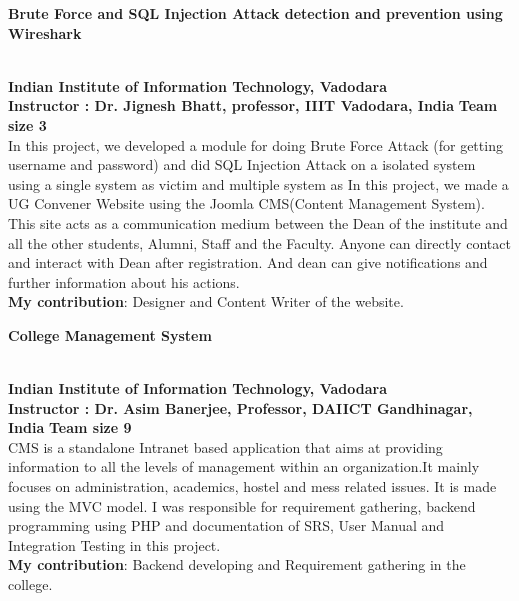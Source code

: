\documentclass{article}
\begin{document}
\begin{large}\textbf{Brute Force and SQL Injection Attack detection and prevention using Wireshark }\end{large} \\
\textbf{Indian Institute of Information Technology, Vadodara}\\
\textbf{ Instructor : Dr. Jignesh Bhatt, professor, IIIT Vadodara, India } \hfill{}
\textbf{Team size 3} \\
In this project, we developed a module for doing Brute Force Attack (for getting username and password) and did SQL Injection Attack on a isolated system using a single system as victim and multiple system as 	In this project, we made a UG Convener Website using the Joomla
CMS(Content Management System). This site acts as a communication medium between the Dean of the institute and all the other students, Alumni, Staff and the Faculty. Anyone can directly contact and interact with Dean after registration. And dean can give notifications and further information about his actions. \\
\textbf{My contribution}: Designer and Content Writer of the website.\\



\begin{large}\textbf{College Management System }\end{large} \\
\textbf{Indian Institute of Information Technology, Vadodara}\\
\textbf{Instructor : Dr. Asim Banerjee, Professor, DAIICT Gandhinagar, India}\hfill{}
\textbf{Team size 9} \\
CMS is a standalone Intranet based application that aims at providing information to all the levels of management within an organization.It mainly focuses on administration, academics, hostel and mess related issues. It is made using the MVC model. I was responsible for requirement gathering, backend programming using PHP and documentation of SRS, User Manual and Integration Testing in this project.\\
\textbf{My contribution}: Backend developing and Requirement gathering in the college.\\
\end{document}
